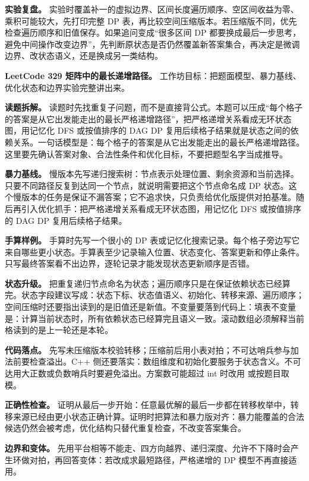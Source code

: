 \textbf{实验复盘。} 实验时覆盖补一的虚拟边界、区间长度遍历顺序、空区间收益为零、乘积可能较大，先打印完整 DP 表，再比较空间压缩版本。若压缩版不同，优先检查遍历顺序和旧值保存。如果追问变成“很多区间 DP 都要换成最后一步思考，避免中间操作改变边界”，先判断原状态是否仍然覆盖新答案集合，再决定是微调边界、改状态语义，还是换成另一类结构。

\noindent\textbf{LeetCode 329 矩阵中的最长递增路径。} 工作坊目标：把题面模型、暴力基线、优化状态和边界实验完整讲出来。

\textbf{读题拆解。} 读题时先找重复子问题，而不是直接背公式。本题可以压成“每个格子的答案是从它出发能走出的最长严格递增路径”，把严格递增关系看成无环状态图，用记忆化 DFS 或按值排序的 DAG DP 复用后续格子结果就是状态之间的依赖关系。一句话模型是：每个格子的答案是从它出发能走出的最长严格递增路径。这里要先确认答案对象、合法性条件和优化目标，不要把题型名字当成推导。

\textbf{暴力基线。} 慢版本先写递归搜索树：节点表示处理位置、剩余资源和当前选择。只要不同路径反复到达同一个节点，就说明需要把这个节点命名成 DP 状态。这个慢版本的任务是保证不漏答案；它不追求快，只负责给优化版提供对拍基准。随后再引入优化抓手：把严格递增关系看成无环状态图，用记忆化 DFS 或按值排序的 DAG DP 复用后续格子结果。

\textbf{手算样例。} 手算时先写一个很小的 DP 表或记忆化搜索记录。每个格子旁边写它来自哪些更小状态。手算表至少记录输入位置、状态变化、答案更新和停止条件。只写最终答案看不出边界，逐轮记录才能发现状态更新顺序是否错。

\textbf{状态升级。} 把重复递归节点命名为状态；遍历顺序只是在保证依赖状态已经算完。状态字段建议写成：状态下标、状态值语义、初始化、转移来源、遍历顺序；空间压缩时还要指出读到的是旧值还是新值。不变量要落到代码上：填表不变量是：计算当前状态时，所有依赖状态已经算完且语义一致。滚动数组必须解释当前格读到的是上一轮还是本轮。

\textbf{代码落点。} 先写未压缩版本校验转移；压缩前后用小表对拍；不可达哨兵参与加法前要检查溢出。C++ 侧还要落实：数组维度和初始化要服务于状态含义。不可达用大正数或负数哨兵时要避免溢出。方案数可能超过 int 时改用  或按题目取模。

\textbf{正确性检查。} 证明从最后一步开始：任意最优解的最后一步都在转移枚举中，转移来源已经由更小状态正确计算。证明时把算法和暴力版对齐：暴力能覆盖的合法候选仍然会被考虑，优化结构只替代重复检查，不改变答案集合。

\textbf{边界和变体。} 先用平台相等不能走、四方向越界、递归深度、允许不下降时会产生环做对拍，再回答变体：若改成求最短路径，严格递增的 DP 模型不再直接适用。

